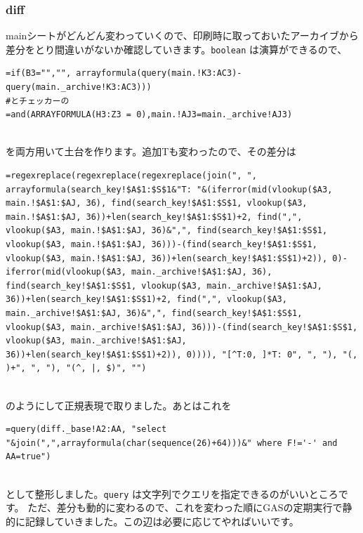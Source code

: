 \documentclass[dvipdfmx,jb5]{jreport}
\begin{document}
\subsubsection{diff}
mainシートがどんどん変わっていくので、印刷時に取っておいたアーカイブから差分をとり間違いがないか確認していきます。\texttt{boolean} は演算ができるので、
\\
\begin{lstlisting}
=if(B3="","", arrayformula(query(main.!K3:AC3)-query(main._archive!K3:AC3)))
#とチェッカーの
=and(ARRAYFORMULA(H3:Z3 = 0),main.!AJ3=main._archive!AJ3)
\end{lstlisting}
\\
を両方用いて土台を作ります。追加Tも変わったので、その差分は
\\
\begin{lstlisting}
=regexreplace(regexreplace(regexreplace(join(", ", arrayformula(search_key!$A$1:$S$1&"T: "&(iferror(mid(vlookup($A3, main.!$A$1:$AJ, 36), find(search_key!$A$1:$S$1, vlookup($A3, main.!$A$1:$AJ, 36))+len(search_key!$A$1:$S$1)+2, find(",", vlookup($A3, main.!$A$1:$AJ, 36)&",", find(search_key!$A$1:$S$1, vlookup($A3, main.!$A$1:$AJ, 36)))-(find(search_key!$A$1:$S$1, vlookup($A3, main.!$A$1:$AJ, 36))+len(search_key!$A$1:$S$1)+2)), 0)-iferror(mid(vlookup($A3, main._archive!$A$1:$AJ, 36), find(search_key!$A$1:$S$1, vlookup($A3, main._archive!$A$1:$AJ, 36))+len(search_key!$A$1:$S$1)+2, find(",", vlookup($A3, main._archive!$A$1:$AJ, 36)&",", find(search_key!$A$1:$S$1, vlookup($A3, main._archive!$A$1:$AJ, 36)))-(find(search_key!$A$1:$S$1, vlookup($A3, main._archive!$A$1:$AJ, 36))+len(search_key!$A$1:$S$1)+2)), 0)))), "[^T:0, ]*T: 0", ", "), "(, )+", ", "), "(^, |, $)", "")
\end{lstlisting}
\\
のようにして正規表現で取りました。あとはこれを
\\
\begin{lstlisting}
=query(diff._base!A2:AA, "select "&join(",",arrayformula(char(sequence(26)+64)))&" where F!='-' and AA=true")
\end{lstlisting}
\\
として整形しました。\texttt{query} は文字列でクエリを指定できるのがいいところです。
ただ、差分も動的に変わるので、これを変わった順にGASの定期実行で静的に記録していきました。この辺は必要に応じてやればいいです。
\\
\end{document}
